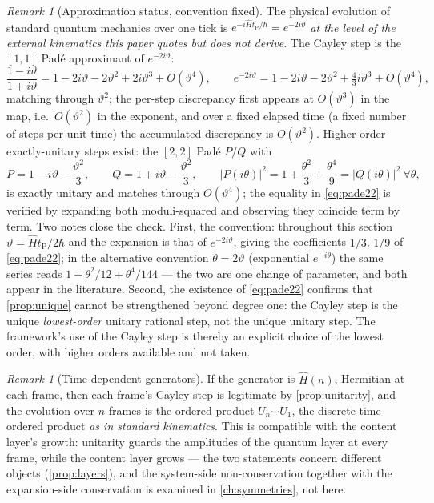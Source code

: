 \documentclass[11pt]{amsbook}
\theoremstyle{plain}
\theoremstyle{definition}
\theoremstyle{remark}
\newtheorem{remark}[theorem]{Remark}
\begin{document}
\begin{remark}[Approximation status, convention fixed]\label{rem:approx}
The physical evolution of standard quantum mechanics over one tick is $e^{-i\hat H t_{\mathrm P}/\hbar} = e^{-2i\vartheta}$ \emph{at the level of the external kinematics this paper quotes but does not derive}. The Cayley step is the $[1,1]$ Pad\'e approximant of $e^{-2i\vartheta}$:
\begin{equation}\label{eq:pade11}
\frac{1 - i\vartheta}{1 + i\vartheta} = 1 - 2i\vartheta - 2\vartheta^{2} + 2i\vartheta^{3} + O(\vartheta^{4}),
\qquad
e^{-2i\vartheta} = 1 - 2i\vartheta - 2\vartheta^{2} + \tfrac{4}{3}i\vartheta^{3} + O(\vartheta^{4}),
\end{equation}
matching through $\vartheta^{2}$; the per-step discrepancy first appears at $O(\vartheta^{3})$ in the map, i.e.\ $O(\vartheta^{2})$ in the exponent, and over a fixed elapsed time (a fixed number of steps per unit time) the accumulated discrepancy is $O(\vartheta^{2})$. Higher-order exactly-unitary steps exist: the $[2,2]$ Pad\'e $P/Q$ with
\begin{equation}\label{eq:pade22}
P = 1 - i\vartheta - \frac{\vartheta^{2}}{3}, \qquad Q = 1 + i\vartheta - \frac{\vartheta^{2}}{3},
\qquad
|P(i\theta)|^{2} = 1 + \frac{\theta^{2}}{3} + \frac{\theta^{4}}{9} = |Q(i\theta)|^{2} \ \forall\theta,
\end{equation}
is exactly unitary and matches through $O(\vartheta^{4})$; the equality in \cref{eq:pade22} is verified by expanding both moduli-squared and observing they coincide term by term. Two notes close the check. First, the convention: throughout this section $\vartheta = \hat H t_{\mathrm P}/2\hbar$ and the expansion is that of $e^{-2i\vartheta}$, giving the coefficients $1/3$, $1/9$ of \cref{eq:pade22}; in the alternative convention $\theta = 2\vartheta$ (exponential $e^{-i\theta}$) the same series reads $1 + \theta^{2}/12 + \theta^{4}/144$ --- the two are one change of parameter, and both appear in the literature. Second, the existence of \cref{eq:pade22} confirms that \cref{prop:unique} cannot be strengthened beyond degree one: the Cayley step is the unique \emph{lowest-order} unitary rational step, not the unique unitary step. The framework's use of the Cayley step is thereby an explicit choice of the lowest order, with higher orders available and not taken.
\end{remark}

\begin{remark}[Time-dependent generators]\label{rem:timedependent}
If the generator is $\hat H(n)$, Hermitian at each frame, then each frame's Cayley step is legitimate by \cref{prop:unitarity}, and the evolution over $n$ frames is the ordered product $U_{n}\cdots U_{1}$, the discrete time-ordered product \emph{as in standard kinematics}. This is compatible with the content layer's growth: unitarity guards the amplitudes of the quantum layer at every frame, while the content layer grows --- the two statements concern different objects (\cref{prop:layers}), and the system-side non-conservation together with the expansion-side conservation is examined in \cref{ch:symmetries}, not here.
\end{remark}
\end{document}
